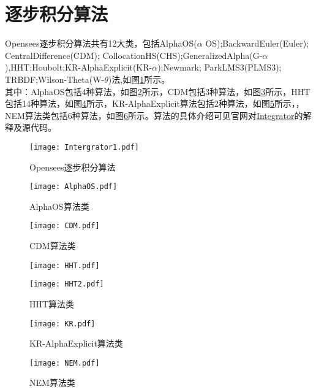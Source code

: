 \documentclass[lang=cn]{elegantpaper}
\begin{document}
\section{逐步积分算法}
Opensees逐步积分算法共有12大类，包括AlphaOS($\alpha$ OS);BackwardEuler(Euler);
CentralDifference(CDM);
CollocationHS(CHS);GeneralizedAlpha(G-$\alpha$),HHT;Houbolt;KR-AlphaExplicit(KR-$\alpha$);Newmark;
ParkLMS3(PLMS3);
TRBDF;Wilson-Theta(W-$\theta$)法,如图\ref{tu1}所示。\\
其中：AlphaOS包括4种算法，如图\ref{tu2}所示，CDM包括3种算法，如图\ref{tu3}所示，HHT包括14种算法，如图\ref{tu4}所示，KR-AlphaExplicit算法包括2种算法，如图\ref{tu5}所示，，NEM算法类包括6种算法，如图\ref{tu6}所示。算法的具体介绍可见官网对\href{http://opensees.berkeley.edu/wiki/index.php/Integrator_Command}{Integrator}的解释及源代码。
\begin{figure}[H]		
	\centering
	\texttt{[image: Intergrator1.pdf]}
	\caption{Opensees逐步积分算法}
	\label{tu1}
\end{figure}
\begin{figure}[H]		
	\centering
	\texttt{[image: AlphaOS.pdf]}
	\caption{AlphaOS算法类}
	\label{tu2}
\end{figure}
\begin{figure}[H]		
	\centering
	\texttt{[image: CDM.pdf]}
	\caption{CDM算法类}
	\label{tu3}
\end{figure}
\begin{figure}[H]		
	\centering
	 \begin{minipage}{1\textwidth}
	\texttt{[image: HHT.pdf]}
	\end{minipage}
	\begin{minipage}{1\textwidth}
		\texttt{[image: HHT2.pdf]}
	\end{minipage}			
	\caption{HHT算法类}
	\label{tu4}
\end{figure}
\begin{figure}[H]	
	\centering
	\texttt{[image: KR.pdf]}
	\caption{KR-AlphaExplicit算法类}
	\label{tu5}
\end{figure}	
\begin{figure}[H]		
	\centering
	\texttt{[image: NEM.pdf]}
	\caption{NEM算法类}
	\label{tu6}
\end{figure}
\end{document}
